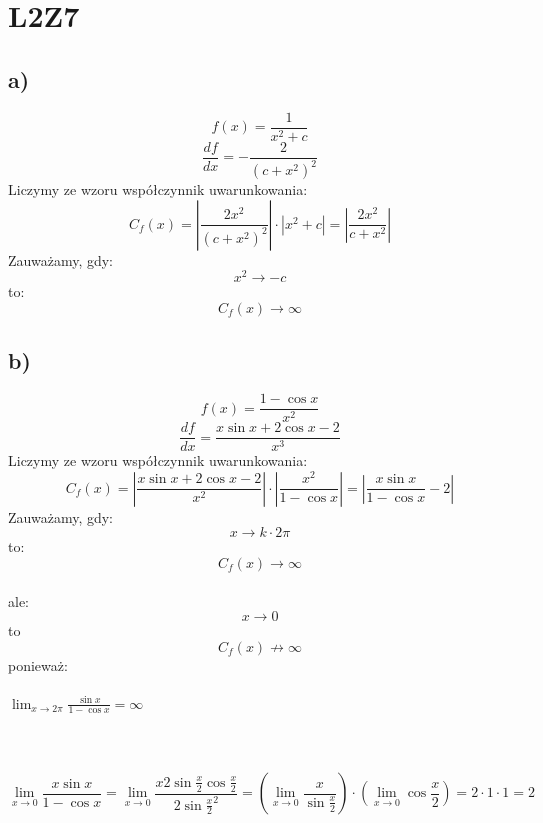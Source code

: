 \documentclass{article}
\title{}
\date{21.10.2020}
\author{Maurycy Borkowski}
\begin{document}
\maketitle

\section{L2Z7}
\subsection*{a)}
$$
f(x) = \frac{1}{x^2 + c}
$$
$$
\frac{df}{dx} = - \frac{2}{(c+x^2)^2}
$$
Liczymy ze wzoru współczynnik uwarunkowania:
$$
C_f(x) = \left| \frac{2x^2}{(c+x^2)^2}\right| \cdot |x^2 +c| =  \left |\frac{2x^2}{c+x^2} \right|
$$
Zauważamy, gdy:
$$
x^2 \rightarrow -c
$$
to:
$$
C_f(x) \rightarrow \infty
$$
\newline
\subsection*{b)}
$$
f(x) = \frac{1 - \cos{x}}{x^2}
$$
$$
\frac{df}{dx} = \frac{x\sin{x}+2\cos{x}-2}{x^3}
$$
Liczymy ze wzoru współczynnik uwarunkowania:
$$
C_f(x) = \left| \frac{x\sin{x}+2\cos{x}-2}{x^2}\right| \cdot \left| \frac{x^2}{1 - \cos{x}} \right| =  \left |\frac{x\sin{x}}{1-\cos{x}} - 2 \right|
$$
Zauważamy, gdy:
$$
x \rightarrow k \cdot 2\pi
$$
to:
$$
C_f(x) \rightarrow \infty
$$
\\ale:
$$
x \rightarrow 0
$$
to
$$
C_f(x) \not\to \infty
$$
ponieważ:\\\\
$\lim_{x \to 2\pi} \frac{\sin{x}}{1-\cos{x}} = \infty$ \\
\\\\\
$$
\lim_{x \to 0}\frac{x\sin{x}}{1-\cos{x}} = \lim_{x \to 0} \frac{x 2\sin{\frac{x}{2}}\cos{\frac{x}{2}}}{2{\sin{\frac{x}{2}}^2}} = \left(\lim_{x \to 0} \frac{x}{\sin{\frac{x}{2}}}\right) \cdot \left(\lim_{x \to 0} \cos{\frac{x}{2}}\right) = 2 \cdot 1 \cdot 1 = 2
$$
\end{document}
